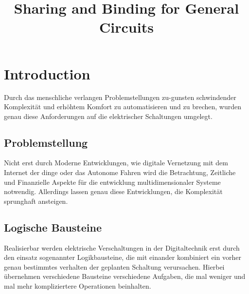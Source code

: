 \documentclass[conference]{IEEEtran}
\begin{document}
\begin{titlepage}

\title{Sharing and Binding for General Circuits\\}

\author{
}
\maketitle
\begin{abstract}

\end{abstract}
\end{titlepage}
\begin{titlepage}
\tableofcontents
\end{titlepage}


\newpage
\section{Introduction}
Durch das menschliche verlangen Problemstellungen zu-gunsten schwindender Komplexität und erhöhtem Komfort zu automatisieren und zu brechen, wurden genau diese Anforderungen auf die elektrischer Schaltungen umgelegt. 
\subsection{Problemstellung}
Nicht erst durch Moderne Entwicklungen, wie digitale Vernetzung mit dem Internet der dinge  oder das Autonome Fahren wird die Betrachtung,  Zeitliche und Finanzielle Aspekte für die entwicklung multidimensionaler Systeme notwendig. Allerdings lassen genau diese Entwicklungen, die Komplexität sprunghaft ansteigen.

\subsection{Logische Bausteine}
Realisierbar werden elektrische Verschaltungen in der Digitaltechnik erst durch den einsatz sogenannter Logikbausteine, die mit einander kombiniert ein vorher genau bestimmtes verhalten der geplanten Schaltung verursachen.
Hierbei übernehmen verschiedene Bausteine verschiedene Aufgaben, die mal weniger und mal mehr kompliziertere Operationen beinhalten. 
\end{document}
